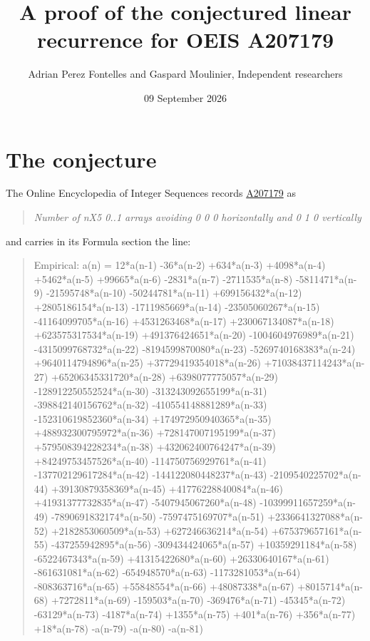 \documentclass[11pt]{article}
\title{A proof of the conjectured linear recurrence for OEIS A207179}
\author{Adrian Perez Fontelles and Gaspard Moulinier, Independent researchers}
\date{09 September 2026}
\theoremstyle{definition}
\begin{document}
\maketitle
\section{The conjecture}

The Online Encyclopedia of Integer Sequences records \href{https://oeis.org/A207179}{A207179} as

\begin{quote}\itshape Number of nX5 0..1 arrays avoiding 0 0 0 horizontally and 0 1 0 vertically\end{quote}

and carries in its Formula section the line:

\begin{quote}\ttfamily Empirical: a(n) = 12*a(n-1) -36*a(n-2) +634*a(n-3) +4098*a(n-4) +5462*a(n-5) +99665*a(n-6) -2831*a(n-7) -2711535*a(n-8) -5811471*a(n-9) -21595748*a(n-10) -50244781*a(n-11) +699156432*a(n-12) +2805186154*a(n-13) -1711985669*a(n-14) -23505060267*a(n-15) -41164099705*a(n-16) +4531263468*a(n-17) +230067134087*a(n-18) +623575317534*a(n-19) +491376424651*a(n-20) -1004604976989*a(n-21) -4315099768732*a(n-22) -8194599870080*a(n-23) -5269740168383*a(n-24) +9640114794896*a(n-25) +37729419354018*a(n-26) +71038437114243*a(n-27) +65206345331720*a(n-28) +6398077775057*a(n-29) -128912250552524*a(n-30) -313243092655199*a(n-31) -398842140156762*a(n-32) -410554148881289*a(n-33) -152310619852360*a(n-34) +174972950940365*a(n-35) +488932300795972*a(n-36) +728147007195199*a(n-37) +579508394228234*a(n-38) +432062400764247*a(n-39) +84249753457526*a(n-40) -114750756929761*a(n-41) -137702129617284*a(n-42) -144122080448237*a(n-43) -2109540225702*a(n-44) +39130879358369*a(n-45) +41776228840084*a(n-46) +41931377732835*a(n-47) -5407945067260*a(n-48) -10399911657259*a(n-49) -7890691832174*a(n-50) -7597475169707*a(n-51) +2336641327088*a(n-52) +2182853060509*a(n-53) +627246636214*a(n-54) +675379657161*a(n-55) -437255942895*a(n-56) -309434424065*a(n-57) +10359291184*a(n-58) -6522467343*a(n-59) +41315422680*a(n-60) +26330640167*a(n-61) -861631081*a(n-62) -654948570*a(n-63) -1173281053*a(n-64) -808363716*a(n-65) +55848554*a(n-66) +48087338*a(n-67) +8015714*a(n-68) +7272811*a(n-69) -159503*a(n-70) -369476*a(n-71) -45345*a(n-72) -63129*a(n-73) -4187*a(n-74) +1355*a(n-75) +401*a(n-76) +356*a(n-77) +18*a(n-78) -a(n-79) -a(n-80) -a(n-81)\end{quote}
\end{document}
